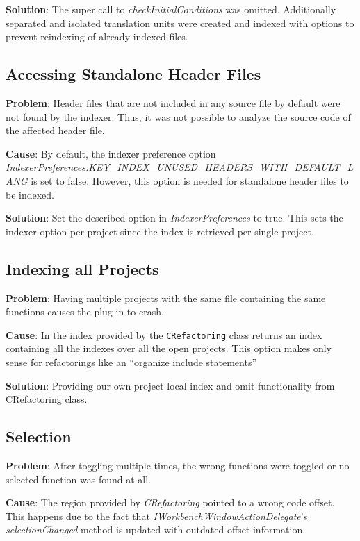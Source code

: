 \textbf{Solution}: The super call to \textit{checkInitialConditions} was
omitted. Additionally separated and isolated translation units were created and
indexed with options to prevent reindexing of already indexed files.

\subsection{Accessing Standalone Header Files}
\textbf{Problem}: Header files that are not included in any source file by 
default were not found by the indexer. Thus, it was not possible to analyze the 
source code of the affected header file.

\textbf{Cause}: By default, the indexer preference option 
\textit{IndexerPreferences.KEY\_INDEX\_UNUSED\_HEADERS\_WITH\_DEFAULT\_LANG} is 
set to false. However, this option is needed for standalone header files to be 
indexed. 

\textbf{Solution}: Set the described option in \textit{IndexerPreferences} to 
true. This sets the indexer option per project since the index is retrieved per
single project.

\subsection{Indexing all Projects}

\textbf{Problem}: Having multiple projects with the same file containing the
same functions causes the plug-in to crash. 

\textbf{Cause}: In the index provided by the \texttt{CRefactoring} class
returns an index containing all the indexes over all the open projects. This
option makes only sense for refactorings like an ``organize include statements''

\textbf{Solution}: Providing our own project local index and omit functionality
from CRefactoring class.

\subsection{Selection}
\textbf{Problem}: After toggling multiple times, the wrong functions were 
toggled or no selected function was found at all. 

\textbf{Cause}: The region provided by \textit{CRefactoring} pointed to a wrong 
code offset. This happens due to the fact that 
\textit{IWorkbenchWindowActionDelegate}'s \textit{selectionChanged} method is 
updated with outdated offset information.

